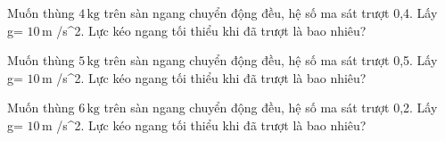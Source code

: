 \begin{bt}
Muốn thùng $4\,\text{kg}$ trên sàn ngang chuyển động đều, hệ số ma sát trượt 0,4. Lấy g= $10\,\text{m}$ /s^2. Lực kéo ngang tối thiểu khi đã trượt là bao nhiêu?
\end{bt}

\begin{bt}
Muốn thùng $5\,\text{kg}$ trên sàn ngang chuyển động đều, hệ số ma sát trượt 0,5. Lấy g= $10\,\text{m}$ /s^2. Lực kéo ngang tối thiểu khi đã trượt là bao nhiêu?
\end{bt}

\begin{bt}
Muốn thùng $6\,\text{kg}$ trên sàn ngang chuyển động đều, hệ số ma sát trượt 0,2. Lấy g= $10\,\text{m}$ /s^2. Lực kéo ngang tối thiểu khi đã trượt là bao nhiêu?
\end{bt}
